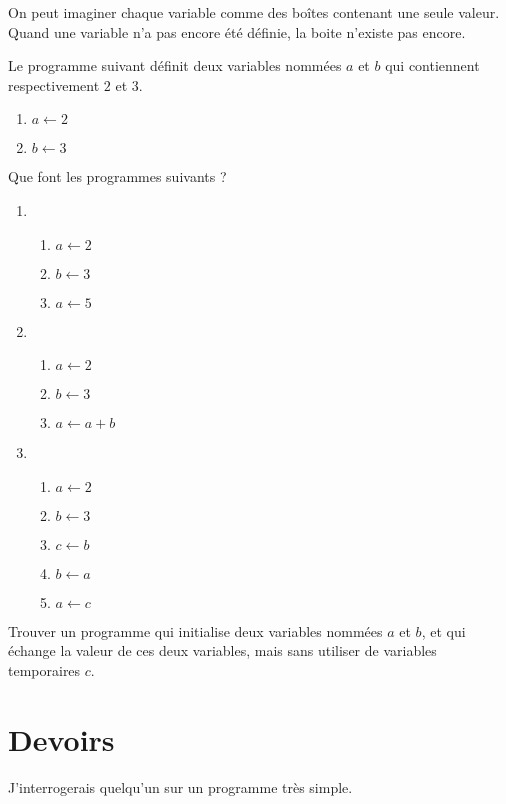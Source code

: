 \documentclass{article}
\begin{document}
\begin{example}
On peut imaginer chaque variable comme des boîtes contenant une seule valeur. Quand une variable n'a pas encore été définie, la boite n'existe pas encore.

Le programme suivant définit deux variables nommées $a$ et $b$ qui contiennent respectivement $2$ et $3$.
\begin{enumerate}
\item $a \leftarrow 2$ 
\item $b \leftarrow 3$ 
\end{enumerate}
Que font les programmes suivants ?
\begin{enumerate}
\item 
\begin{enumerate}
    \item $a \leftarrow 2$ 
    \item $b \leftarrow 3$ 
    \item $a \leftarrow 5$ 
\end{enumerate}
\item
\begin{enumerate}
    \item $a \leftarrow 2$ 
    \item $b \leftarrow 3$ 
    \item $a \leftarrow a+b$ 
\end{enumerate}
\item 
\begin{enumerate}
\item $a \leftarrow 2$
\item $b \leftarrow 3$
\item $c \leftarrow b$
\item $b \leftarrow a$
\item $a \leftarrow c$ 
\end{enumerate}
\end{enumerate}
\end{example}

\begin{exercize}
Trouver un programme qui initialise deux variables nommées $a$ et $b$, et qui échange la valeur de ces deux variables, mais sans utiliser de variables temporaires $c$.
\end{exercize}

\section{Devoirs}
J'interrogerais quelqu'un sur un programme très simple.
\end{document}
